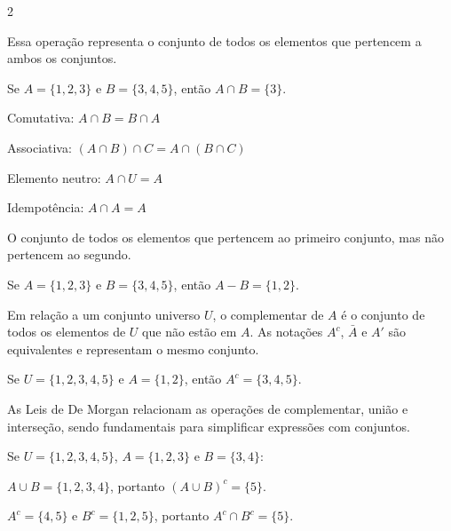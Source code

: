 \documentclass[12pt]{article}
\begin{document}
\begin{multicols}{2}

Essa operação representa o conjunto de todos os elementos que pertencem a ambos os conjuntos.


Se $A = \{1, 2, 3\}$ e $B = \{3, 4, 5\}$, então $A \cap B = \{3\}$.


\hspace{1cm}Comutativa: $A \cap B = B \cap A$

\hspace{1cm}Associativa: $(A \cap B) \cap C = A \cap (B \cap C)$

\hspace{1cm}Elemento neutro: $A \cap U = A$

\hspace{1cm}Idempotência: $A \cap A = A$


O conjunto de todos os elementos que pertencem ao primeiro conjunto, mas não pertencem ao segundo.


Se $A = \{1, 2, 3\}$ e $B = \{3, 4, 5\}$, então $A - B = \{1, 2\}$.


Em relação a um conjunto universo $U$, o complementar de $A$ é o conjunto de todos os elementos de $U$ que não estão em $A$. As notações $A^c$, $\bar{A}$ e $A'$ são equivalentes e representam o mesmo conjunto.


Se $U = \{1, 2, 3, 4, 5\}$ e $A = \{1, 2\}$, então $A^c = \{3, 4, 5\}$.


As Leis de De Morgan relacionam as operações de complementar, união e interseção, sendo fundamentais para simplificar expressões com conjuntos.




Se $U = \{1, 2, 3, 4, 5\}$, $A = \{1, 2, 3\}$ e $B = \{3, 4\}$:

$A \cup B = \{1, 2, 3, 4\}$, portanto $(A \cup B)^c = \{5\}$.

$A^c = \{4, 5\}$ e $B^c = \{1, 2, 5\}$, portanto $A^c \cap B^c = \{5\}$. \checkmark


\end{multicols}
\end{document}
